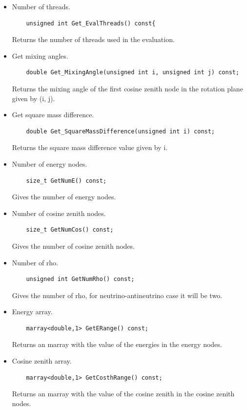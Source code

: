 \documentclass[3p,12pt]{elsarticle}
\newcommand{\ttf}{\ttfamily}
\begin{document}
\begin{itemize}
\item Number of threads.
  \begin{lstlisting}
    unsigned int Get_EvalThreads() const{
  \end{lstlisting}
  Returns the number of threads used in the evaluation.
\item Get mixing angles.
  \begin{lstlisting}
    double Get_MixingAngle(unsigned int i, unsigned int j) const;
  \end{lstlisting}
  Returns the mixing angle of the first cosine zenith node in the
  rotation plane given by ({\ttf i}, {\ttf j}).

\item Get square mass difference.
  \begin{lstlisting}
    double Get_SquareMassDifference(unsigned int i) const;
  \end{lstlisting}
  Returns the square mass difference value given by {\ttf i}.
 \item Number of energy nodes.
  \begin{lstlisting}
    size_t GetNumE() const;
  \end{lstlisting}
  Gives the number of energy nodes.

 \item Number of cosine zenith nodes.
  \begin{lstlisting}
    size_t GetNumCos() const;
  \end{lstlisting}
  Gives the number of cosine zenith nodes.

\item Number of rho.
  \begin{lstlisting}
    unsigned int GetNumRho() const;
  \end{lstlisting}
  Gives the number of {\ttf rho}, for neutrino-antineutrino case it
  will be two. 

\item  Energy array. 
  \begin{lstlisting}
    marray<double,1> GetERange() const;
  \end{lstlisting}
  Returns an {\ttf marray} with the value of the energies in the
  energy nodes.

\item Cosine zenith array.
  \begin{lstlisting}
    marray<double,1> GetCosthRange() const;
  \end{lstlisting}
  Returns an {\ttf marray} with the value of the cosine zenith in the
  cosine zenith nodes.


\end{itemize}
\end{document}
